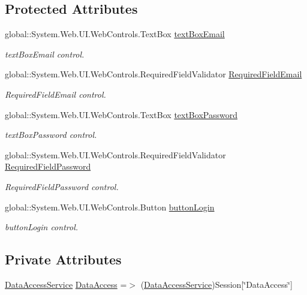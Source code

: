 \subsection*{Protected Attributes}
\begin{DoxyCompactItemize}
\item 
global\+::\+System.\+Web.\+U\+I.\+Web\+Controls.\+Text\+Box \mbox{\hyperlink{classWebApplication_1_1Inicio_a13ef502ea57d897fdd0ae107508d8fbb}{text\+Box\+Email}}
\begin{DoxyCompactList}\small\item\em text\+Box\+Email control. \end{DoxyCompactList}\item 
global\+::\+System.\+Web.\+U\+I.\+Web\+Controls.\+Required\+Field\+Validator \mbox{\hyperlink{classWebApplication_1_1Inicio_a6060adcae37ac670afcf5c3ba229d926}{Required\+Field\+Email}}
\begin{DoxyCompactList}\small\item\em Required\+Field\+Email control. \end{DoxyCompactList}\item 
global\+::\+System.\+Web.\+U\+I.\+Web\+Controls.\+Text\+Box \mbox{\hyperlink{classWebApplication_1_1Inicio_a0cff7e27599760cdcf05565f5eaa54e5}{text\+Box\+Password}}
\begin{DoxyCompactList}\small\item\em text\+Box\+Password control. \end{DoxyCompactList}\item 
global\+::\+System.\+Web.\+U\+I.\+Web\+Controls.\+Required\+Field\+Validator \mbox{\hyperlink{classWebApplication_1_1Inicio_a47510251f435c39f6ca1b35d7db252d7}{Required\+Field\+Password}}
\begin{DoxyCompactList}\small\item\em Required\+Field\+Password control. \end{DoxyCompactList}\item 
global\+::\+System.\+Web.\+U\+I.\+Web\+Controls.\+Button \mbox{\hyperlink{classWebApplication_1_1Inicio_a3a35697eb44344439551b307b06fd36b}{button\+Login}}
\begin{DoxyCompactList}\small\item\em button\+Login control. \end{DoxyCompactList}\end{DoxyCompactItemize}
\subsection*{Private Attributes}
\begin{DoxyCompactItemize}
\item 
\mbox{\hyperlink{classDataBaseAccess_1_1DataAccessService}{Data\+Access\+Service}} \mbox{\hyperlink{classWebApplication_1_1Inicio_af08ee9b91d0d180dfe4778c6da094365}{Data\+Access}} =$>$ (\mbox{\hyperlink{classDataBaseAccess_1_1DataAccessService}{Data\+Access\+Service}})Session\mbox{[}\char`\"{}Data\+Access\char`\"{}\mbox{]}
\end{DoxyCompactItemize}


